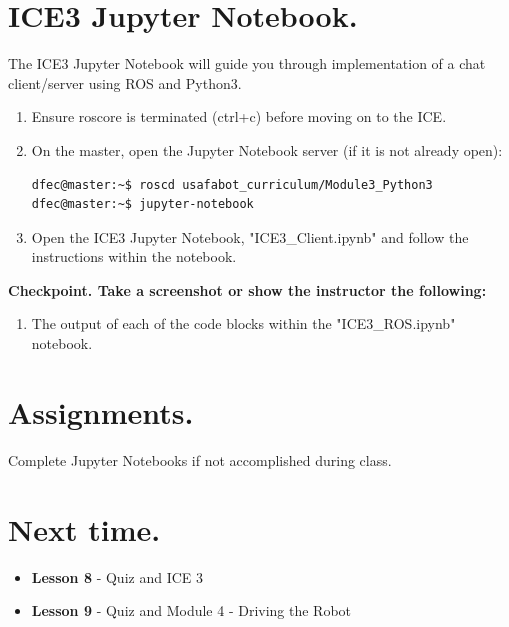 \documentclass{handout}
\begin{document}
\section{ICE3 Jupyter Notebook.}
The ICE3 Jupyter Notebook will guide you through implementation of a chat client/server using ROS and Python3.

\begin{enumerate}\setlength\itemsep{1em}
	\item Ensure roscore is terminated (ctrl+c) before moving on to the ICE.
	\item On the master, open the Jupyter Notebook server (if it is not already open):
\begin{lstlisting}[language=bash]
dfec@master:~$ roscd usafabot_curriculum/Module3_Python3
dfec@master:~$ jupyter-notebook
\end{lstlisting}
	
	\item Open the ICE3 Jupyter Notebook, "ICE3\_Client.ipynb" and follow the instructions within the notebook. 
\end{enumerate}

\textbf{Checkpoint. Take a screenshot or show the instructor the following:}
\begin{enumerate}
	\item The output of each of the code blocks within the "ICE3\_ROS.ipynb" notebook.
\end{enumerate}

\section{Assignments.}
	\begin{todolist}
		\item Complete Jupyter Notebooks if not accomplished during class.
	\end{todolist}

\section{Next time.}
	\begin{itemize}
		\item \textbf{Lesson 8} - Quiz and ICE 3
		\item \textbf{Lesson 9} - Quiz and Module 4 - Driving the Robot
	\end{itemize}
\end{document}
